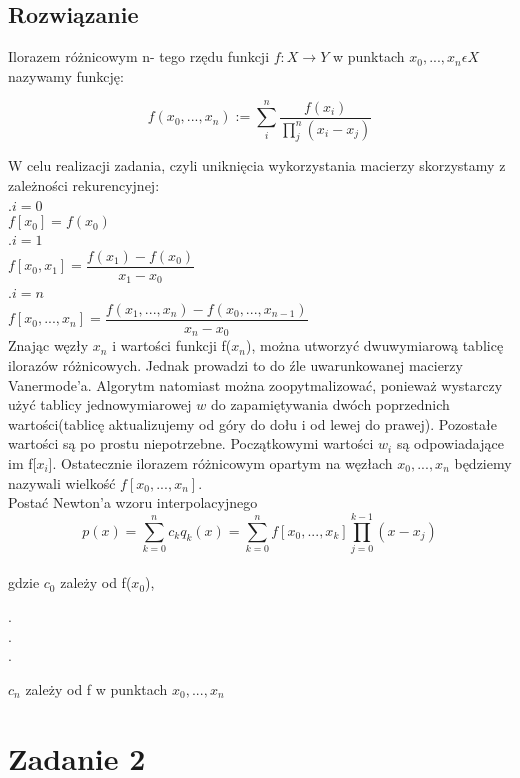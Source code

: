 \documentclass[11pt]{article}
\begin{document}
\begin{flushleft}
\subsection{Rozwiązanie}
Ilorazem różnicowym n- tego rzędu funkcji $f:X\longrightarrow Y$ w punktach $x_0, ..., x_n \epsilon X$ nazywamy funkcję:\\
\begin{center}
$$f(x_0,...,x_n) := \sum^n_i\dfrac{f(x_i)}{\prod_j^n (x_i-x_j)}$$
\end{center}
\newpage
\bigskip
W celu realizacji zadania, czyli uniknięcia wykorzystania macierzy skorzystamy z zależności rekurencyjnej:\\
.$i=0$\\
\quad$f[x_0]=f(x_0)$\\
.$i=1$\\
\quad$f[x_0,x_1]=\dfrac{f(x_1)-f(x_0)}{x_1-x_0}$\\
.$i=n$\\
\quad$f[x_0,...,x_n]=
\dfrac{f(x_1,...,x_n)-f(x_0,...,x_{n-1})}{x_n-x_0}$\\
\bigskip
Znając węzły $x_n$ i wartości funkcji f($x_n$), można utworzyć dwuwymiarową tablicę ilorazów różnicowych. Jednak prowadzi to do źle uwarunkowanej macierzy Vanermode'a. Algorytm natomiast można zoopytmalizować, ponieważ wystarczy użyć tablicy jednowymiarowej $w$ do zapamiętywania dwóch poprzednich wartości(tablicę aktualizujemy od góry do dołu i od lewej do prawej). Pozostałe wartości są po prostu niepotrzebne. Początkowymi wartości $w_i$ są odpowiadające im f[$x_i$]. Ostatecznie ilorazem różnicowym opartym na węzłach $x_0,...,x_n$ będziemy nazywali wielkość $f[x_0,...,x_n]$.\\
\bigskip
Postać Newton'a wzoru interpolacyjnego\\
\bigskip
$$p(x)=\sum^n_{k=0}c_kq_k(x)=\sum^n_{k=0}f[x_0,...,x_k]\prod^{k-1}_{j=0}(x-x_j)$$\\
\bigskip
\quad gdzie $c_0$ zależy od f($x_0$), \\
\begin{center}
.\\.\\.\\
\end{center}
\quad $c_n$ zależy od f w punktach $x_0,...,x_n $\\
\bigskip
\newpage
\section{Zadanie 2}

\end{flushleft}
\end{document}
